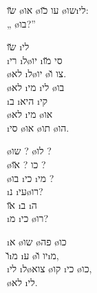 \begin{twocol}
\begin{stanza}
\u{שו} \o{או} \o{עו} \u{כו} \o{שו}\i{לי}:\\
„   \o{בו}?”
\end{stanza}

\begin{stanza}
\u{שו} \i{לי} \\
\i{רי} \i{ל}\o{יו}  \i{סי} \u{מו}\\
 \o{לא} \i{ל}\o{יו}  \o{צו} \u{ו}.\\
 \o{לא} \i{מי} \i{לי} \o{בו}\\
 \i{ב} \i{היא} \i{קי} \\
\o{לא} \i{מי}  \o{או}\\
\i{סי} \o{או}  \o{תו} \o{הו}.
\end{stanza}

\begin{stanza}
\o{שו}  ? \o{לו}  ?\\
\o{כו}  ? \u{או}   ?\\
 \o{בו} \i{כי} \i{מי} ?\\
\i{נ}  \i{עי}\o{רו}?\\
\u{או} \i{ב} \i{ה}\\
\i{מ} \i{כי} \o{רו}?
\end{stanza}

\begin{stanza}
\i{א} \o{שו} \o{פה} \o{כו}\\
\u{ו}\i{מ} \i{ע} \o{יו} \u{ו}\i{מ},\\
\i{לי}  \i{ל}\o{צוא}  \o{קו} \i{כי} \o{כו},\\
\o{לא} \i{לי}.
\end{stanza}
\end{twocol}



